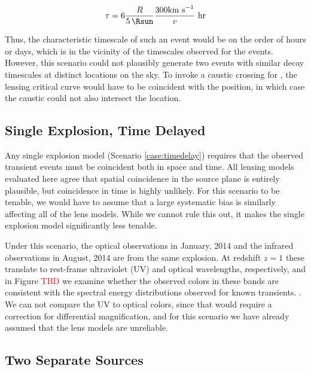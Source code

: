 \begin{equation}
  \tau = 6\frac{R}{5\,\Rsun}\frac{300 {\rm km~ s}^{-1}}{v}~\rm{hr}
\label{eqn:caustic_crossing_time}
\end{equation}


\noindent Thus, the characteristic timescale of such an event would be
on the order of hours or days, which is in the vicinity of the
timescales observed for the \spock events.  However, this scenario
could not plausibly generate two events with similar decay timescales
at distinct locations on the sky. To invoke a caustic crossing for
\spockone, the lensing critical curve would have to be coincident with
the \spockone position, in which case the caustic could not also
intersect the \spocktwo location.


\subsection{Single Explosion, Time Delayed}

Any single explosion model (Scenario \ref{case:timedelay}) requires that the observed
transient events must be coincident both in space and time.  All
lensing models evaluated here agree that spatial coincidence in the
source plane is entirely plausible, but coincidence in time is highly
unlikely. For this scenario to be tenable, we would have to assume
that a large systematic bias is similarly affecting all of the lens
models.  While we cannot rule this out, it makes the single explosion
model significantly less tenable. 

Under this scenario, the optical observations in January, 2014 and the
infrared observations in August, 2014 are from the same explosion. At
redshift $z=1$ these translate to rest-frame ultraviolet (UV) and
optical wavelengths, respectively, and in Figure \textcolor{red}{TBD}
we examine whether the observed colors in these bands are consistent
with the spectral energy distributions observed for known transients.
.  We can not
compare the UV to optical colors, since that would require a
correction for differential magnification, and for this scenario we
have already assumed that the lens models are unreliable. 



\subsection{Two Separate Sources}

